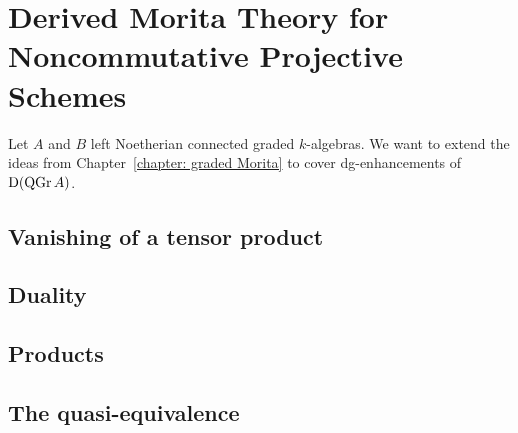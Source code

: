 \chapter{Derived Morita Theory for Noncommutative Projective Schemes} \label{section: morita for NCP}

Let \(A\) and \(B\) left Noetherian connected graded \(k\)-algebras.
We want to extend the ideas from Chapter~\ref{chapter: graded Morita} to cover dg-enhancements of \(\mathrm{D}(\operatorname{QGr}A)\).

\section{Vanishing of a tensor product} \label{subsection: vanishing of tensor}


\section{Duality}


\section{Products} \label{section: products}


\section{The quasi-equivalence}


